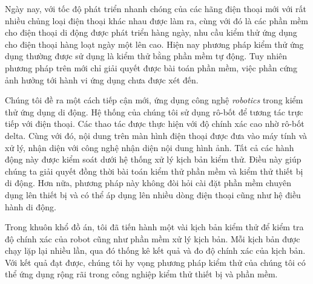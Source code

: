 \begin{vnabstract}
	\indent Ngày nay, với tốc độ phát triển nhanh chóng của các hãng điện thoại mới với rất nhiều chủng loại điện thoại khác nhau được làm ra, cùng với đó là các phần mềm cho điện thoại di động được phát triển hàng ngày, nhu cầu kiểm thử ứng dụng cho điện thoại hàng loạt ngày một lên cao. Hiện nay phương pháp kiểm thử ứng dụng thường được sử dụng là kiểm thử bằng phần mềm tự động. Tuy nhiên phương pháp trên mới chỉ giải quyết được bài toán phần mềm, việc phần cứng ảnh hưởng tới hành vi ứng dụng chưa được xét đến.
	
	Chúng tôi đề ra một cách tiếp cận mới, ứng dụng công nghệ \textit{robotics} trong kiểm thử ứng dụng di động. Hệ thống của chúng tôi sử dụng rô-bốt để tương tác trực tiếp với điện thoại. Các thao tác được thực hiện với độ chính xác cao nhờ rô-bốt delta. Cùng với đó, nội dung trên màn hình điện thoại được đưa vào máy tính và xử lý, nhận diện với công nghệ nhận diện nội dung hình ảnh. Tất cả các hành động này được kiểm soát dưới hệ thống xử lý kịch bản kiểm thử. Điều này giúp chúng ta giải quyết đồng thời bài toán kiểm thử phần mềm và kiểm thử thiết bị di động. Hơn nữa, phương pháp này không đòi hỏi cài đặt phần mềm chuyên dụng lên thiết bị và có thể áp dụng lên nhiều dòng điện thoại cũng như hệ điều hành di động.
	
	Trong khuôn khổ đồ án, tôi đã tiến hành một vài kịch bản kiểm thử để kiểm tra độ chính xác của robot cũng như phần mềm xử lý kịch bản. Mỗi kịch bản được chạy lặp lại nhiều lần, qua đó thống kê kết quả và đo độ chính xác của kịch bản. Với kết quả đạt được, chúng tôi hy vọng phương pháp kiểm thử của chúng tôi có thể ứng dụng rộng rãi trong công nghiệp kiểm thử thiết bị và phần mềm.

\end{vnabstract}